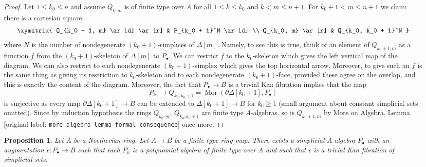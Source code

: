\documentclass[10pt,a4paper]{article}
\theoremstyle{plain}
\newtheorem{proposition}[subsection]{Proposition}
\theoremstyle{definition}
\theoremstyle{remark}
\numberwithin{equation}{subsection}
\def\Mor{\mathop{\mathrm{Mor}}\nolimits}
\begin{document}
\begin{proof}
\medskip\noindent
Let $1 \leq k_0 \leq n$ and assume $Q_{k, m}$ is of finite type
over $A$ for all $1 \leq k \leq k_0$ and $k < m \leq n + 1$.
For $k_0 + 1 < m \leq n + 1$ we claim there is a cartesian square
$$
\xymatrix{
Q_{k_0 + 1, m} \ar[d] \ar[r] & P_{k_0 + 1}^N \ar[d] \\
Q_{k_0, m} \ar[r] & Q_{k_0, k_0 + 1}^N
}
$$
where $N$ is the number of nondegenerate $(k_0 + 1)$-simplices
of $\Delta[m]$. Namely, to see this is true, think of an element of
$Q_{k_0 + 1, m}$ as a function $f$ from the $(k_0 + 1)$-skeleton
of $\Delta[m]$ to $P_\bullet$. We can restrict $f$ to the $k_0$-skeleton
which gives the left vertical map of the diagram. We can also restrict
to each nondegenerate $(k_0 + 1)$-simplex which gives the top horizontal
arrow. Moreover, to give such an $f$ is the same thing as giving its
restriction to $k_0$-skeleton and to each nondegenerate
$(k_0 + 1)$-face, provided these agree on the overlap, and this
is exactly the content of the diagram. Moreover, the fact that
$P_\bullet \to B$ is a trivial Kan fibration implies that
the map
$$
P_{k_0} \to Q_{k_0, k_0 + 1} = \Mor(\partial \Delta[k_0 + 1], P_\bullet)
$$
is surjective as every map $\partial \Delta[k_0 + 1] \to B$ can be extended
to $\Delta[k_0 + 1] \to B$ for $k_0 \geq 1$ (small argument about constant
simplicial sets omitted). Since by induction hypothesis the rings
$Q_{k_0, m}$, $Q_{k_0, k_0 + 1}$ are finite type $A$-algebras, so is
$Q_{k_0 + 1, m}$ by
More on Algebra, Lemma \textnormal{[original label: \nolinkurl{more-algebra-lemma-formal-consequence}]}
once more.
\end{proof}

\begin{proposition}
\label{proposition-polynomial}
Let $A$ be a Noetherian ring. Let $A \to B$ be a finite type ring map.
There exists a simplicial $A$-algebra $P_\bullet$ with an augmentation
$\epsilon : P_\bullet \to B$ such that each $P_n$ is a polynomial algebra
of finite type over $A$ and such that $\epsilon$ is a trivial
Kan fibration of simplicial sets.
\end{proposition}
\end{document}

